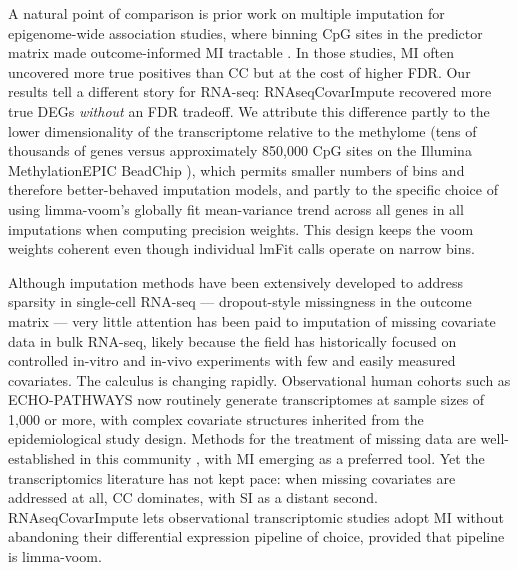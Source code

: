 \documentclass[11pt]{article}
\begin{document}
A natural point of comparison is prior work on multiple imputation for epigenome-wide association studies, where binning CpG sites in the predictor matrix made outcome-informed MI tractable \citep{mill2013epigenomewide,weinhold2020statistical}. In those studies, MI often uncovered more true positives than CC but at the cost of higher FDR. Our results tell a different story for RNA-seq: RNAseqCovarImpute recovered more true DEGs \emph{without} an FDR tradeoff. We attribute this difference partly to the lower dimensionality of the transcriptome relative to the methylome (tens of thousands of genes versus approximately 850{,}000 CpG sites on the Illumina MethylationEPIC BeadChip \citep{pidsley2016critical}), which permits smaller numbers of bins and therefore better-behaved imputation models, and partly to the specific choice of using limma-voom's globally fit mean-variance trend across all genes in all imputations when computing precision weights. This design keeps the voom weights coherent even though individual lmFit calls operate on narrow bins.

Although imputation methods have been extensively developed to address sparsity in single-cell RNA-seq --- dropout-style missingness in the outcome matrix \citep{hao2024scrnaseq} --- very little attention has been paid to imputation of missing covariate data in bulk RNA-seq, likely because the field has historically focused on controlled in-vitro and in-vivo experiments with few and easily measured covariates. The calculus is changing rapidly. Observational human cohorts such as ECHO-PATHWAYS \citep{paulson2022lewinn,paquette2023placental} now routinely generate transcriptomes at sample sizes of 1,000 or more, with complex covariate structures inherited from the epidemiological study design. Methods for the treatment of missing data are well-established in this community \citep{sterne2009multiple,little2019statistical,marshall2009combining}, with MI emerging as a preferred tool. Yet the transcriptomics literature has not kept pace: when missing covariates are addressed at all, CC dominates, with SI as a distant second. RNAseqCovarImpute lets observational transcriptomic studies adopt MI without abandoning their differential expression pipeline of choice, provided that pipeline is limma-voom.
\end{document}
